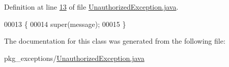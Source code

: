 Definition at line \hyperlink{UnauthorizedException_8java_source_l00013}{13} of file \hyperlink{UnauthorizedException_8java_source}{Unauthorized\-Exception.\-java}.


\begin{DoxyCode}
00013                                                 \{
00014         super(message);
00015     \}
\end{DoxyCode}


The documentation for this class was generated from the following file\-:\begin{DoxyCompactItemize}
\item 
pkg\-\_\-exceptions/\hyperlink{UnauthorizedException_8java}{Unauthorized\-Exception.\-java}\end{DoxyCompactItemize}
